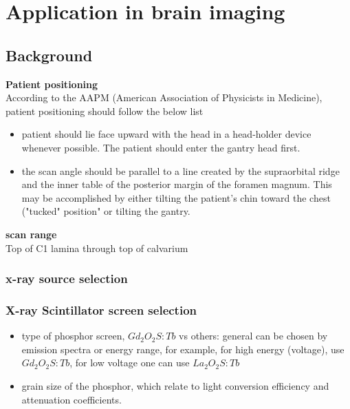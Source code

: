 \chapter{Application in brain imaging}
\label{chap:brain_imaging}

\section{Background}

\noindent \textbf{Patient positioning} \\
\noindent According to the AAPM (American Association of Physicists in Medicine), patient positioning should follow the below list\citep{aapm_headCT2012}
\begin{itemize}
\item patient should lie face upward with the head in a head-holder device whenever possible.  The patient should enter the gantry head first.
\item the scan angle should be parallel to a line created by the supraorbital ridge and the inner table of the posterior margin of the foramen magnum.  This may be accomplished by either tilting the patient's chin toward the chest ("tucked" position" or tilting the gantry.
\end{itemize}

\noindent \textbf{scan range} \\
\noindent Top of C1 lamina through top of calvarium \\

\subsection{x-ray source selection}
\subsection{X-ray Scintillator screen selection}

\begin{itemize}
\item type of phosphor screen, $Gd_2O_2S:Tb$ vs others: general can be chosen by emission spectra or energy range, for example, for high energy (voltage), use $Gd_2O_2S:Tb$, for low voltage one can use $La_2O_2S:Tb$ \cite{Kandarakis2001}

\item grain size of the phosphor, which relate to light conversion efficiency and attenuation coefficients.

\end{itemize}

